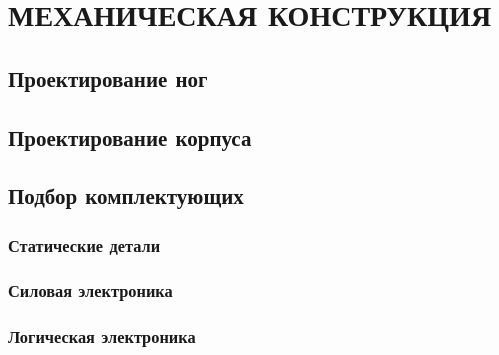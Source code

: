 \chapter{\MakeUppercase{Механическая конструкция}}
\section{Проектирование ног}

\section{Проектирование корпуса}

\section{Подбор комплектующих}
\subsection{Статические детали}

\subsection{Силовая электроника}

\subsection{Логическая электроника}